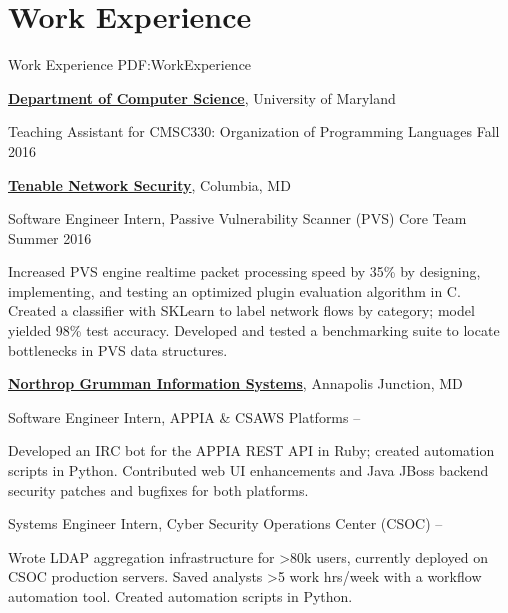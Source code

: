 
\section
{Work Experience}
{Work Experience}
{PDF:WorkExperience}

\href{https://cs.umd.edu/}
{\textbf{Department of Computer Science}},
University of Maryland
\hfill

\GapNoBreak
\hspace{1em} Teaching Assistant for CMSC330: Organization of Programming Languages
\hfill
Fall 2016

\GapNoBreak
\href{https://www.tenable.com/}
{\textbf{Tenable Network Security}},
Columbia, MD

\GapNoBreak
\hspace{1em} Software Engineer Intern, Passive Vulnerability Scanner (PVS) Core Team
\hfill
Summer 2016
\begin{detail}
\SubBulletItem
Increased PVS engine realtime packet processing speed by 35\% by designing, implementing, and testing an optimized plugin evaluation algorithm in C.
\SubBulletItem
Created a classifier with SKLearn to label network flows by category; model yielded 98\% test accuracy.
\SubBulletItem
Developed and tested a benchmarking suite to locate bottlenecks in PVS data structures.
\end{detail}

\Gap
\href{https://www.ngc.com/}
{\textbf{Northrop Grumman Information Systems}},
Annapolis Junction, MD

\GapNoBreak
\hspace{1em} 
Software Engineer Intern, APPIA \& CSAWS Platforms
\hfill
{} --
\begin{detail}
\SubBulletItem
Developed an IRC bot for the APPIA REST API in Ruby; created automation scripts in Python.
\SubBulletItem
Contributed web UI enhancements and Java JBoss backend security patches and bugfixes for both platforms.
\end{detail}

\GapNoBreak
\hspace{1em} 
Systems Engineer Intern, Cyber Security Operations Center (CSOC)
\hfill
{} --
\begin{detail}
\SubBulletItem
Wrote LDAP aggregation infrastructure for >80k users, currently deployed on CSOC production servers.
\SubBulletItem
Saved analysts >5 work hrs/week with a workflow automation tool. Created automation scripts in Python.
\end{detail}
